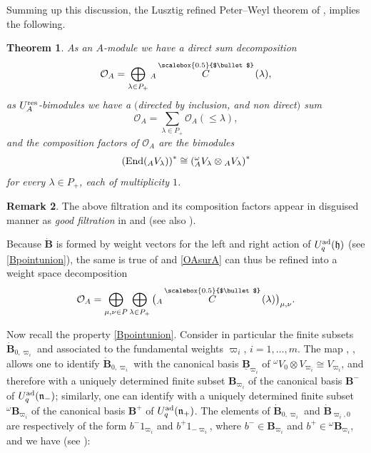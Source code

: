 \documentclass[10pt,a4paper]{amsart}
\numberwithin{equation}{section}
\newtheorem{teo}{Theorem}[section]
\theoremstyle{definition}
\newtheorem{Remark}[teo]{Remark}
\newcommand{\Oo}{{\mathcal O}}
\newcommand{\smallbullet}{%
\vcenter{\hbox{\,\scalebox{0.5}{$\bullet$}\,}}
}
\begin{document}
Summing up this discussion, the Lusztig refined Peter--Weyl theorem of \cite[Section~29.3]{Lusztig}, implies the following.

\begin{teo} As an $A$-module we have a direct sum decomposition
\begin{equation}\label{OAsurA} \Oo_A = \bigoplus_{\lambda\in P_+} {}_A \overset{\raisebox{-1.5pt}{\scriptsize$\smallbullet$}}{C} (\lambda),
\end{equation}
as $U_A^{\rm res}$-bimodules we have a $($directed by inclusion, and non direct$)$ sum
\begin{equation}\label{OAbimod}
\Oo_A = \sum_{\lambda\in P_+} \Oo_A(\leq \lambda),
\end{equation}
and the composition factors of $\Oo_A$ are the bimodules
\begin{equation}\label{OAfacteurs}
\left({\rm End}({}_A V_\lambda)\right)^* \cong \left({}_A^{\omega} V_\lambda \otimes {}_A V_\lambda \right)^*
\end{equation}
for every $\lambda\in P_+$, each of multiplicity $1$. \end{teo}
\begin{Remark}{\rm The above filtration and its composition factors appear in disguised manner as {\it good filtration} in \cite{APW} and \cite{Paradowski} (see also \cite{VV}).}
\end{Remark}
Because $\dot{\mathbf{B}}$ is formed by weight vectors for the left and right action of $U_q^{\rm ad}(\mathfrak{h})$ (see \eqref{Bpointunion}), the same is true of  and \eqref{OAsurA} can thus be refined into a weight space decomposition
\begin{equation}\label{OAweightdecomp} \Oo_A = \bigoplus_{\mu,\nu\in P}\bigoplus_{\lambda\in P_+} \big({}_A \overset{\raisebox{-1.5pt}{\scriptsize$\smallbullet$}}{C} (\lambda)\big)_{\mu,\nu}.
\end{equation}

Now recall the property \eqref{Bpointunion}. Consider in particular the finite subsets $\dot{\mathbf{B}}_{0,\varpi_i}$ and  associated to the fundamental weights $\varpi_i$, $i=1,\dots, m$. The map , , allows one to identify $\dot{\mathbf{B}}_{0,\varpi_i}$ with the canonical basis $\underline{\mathbf{B}}_{\varpi_i}$ of ${}^\omega V_{0}\otimes V_{\varpi_i} \cong V_{\varpi_i}$, and therefore with a uniquely determined finite subset $\mathbf{B}_{\varpi_i}$ of the canonical basis $\mathbf{B}^-$ of $U_q^{\rm ad}(\mathfrak{n}_-)$; similarly, one can identify  with a uniquely determined finite subset ${}^\omega \mathbf{B}_{\varpi_i}$ of the canonical basis $\mathbf{B}^+$ of $U_q^{\rm ad}(\mathfrak{n}_+)$. The elements of $\dot{\mathbf{B}}_{0,\varpi_i}$ and $\dot{\mathbf{B}}_{\varpi_i,0}$ are respectively of the form $b^-1_{\varpi_i}$ and $b^+1_{-\varpi_i}$, where $b^- \in \mathbf{B}_{\varpi_i}$ and $b^+\in {}^\omega \mathbf{B}_{\varpi_i}$, and we have (see \cite[Proposition~3.3 and Section~3.4]{Lusztig3}):
\end{document}
